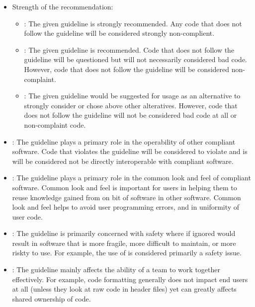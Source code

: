 \begin{itemize}

{}\item Strength of the recommendation:

  \begin{itemize}

  {}\item\textbf{\StrongRecGC}: The given guideline is strongly
  recommended.  Any code that does not follow the guideline will be
  considered strongly non-complient.

  {}\item\textbf{\RecGC}: The given guideline is recommended.  Code
  that does not follow the guideline will be questioned but will not
  necessarily considered bad code.  However, code that does not follow
  the guideline will be considered non-complaint.

  {}\item\textbf{\SuggestGC}: The given guideline would be suggested
  for usage as an alternative to strongly consider or chose above
  other alteratives.  However, code that does not follow the guideline
  will not be considered bad code at all or non-complaint code.

  \end{itemize}

{}\item\textbf{\InteropGC}: The guideline plays a primary role
in the operability of other compliant software.  Code that violates
the guideline will be considered to violate and is {} will be considered not be directly interoperable with
compliant software.

{}\item\textbf{\ComLookFeelGC}: The guideline plays a primary role in
the common look and feel of compliant software.  Common look and feel
is important for users in helping them to reuse knowledge gained from
on bit of software in other software.  Common look and feel helps to
avoid user programming errors, and in uniformity of user code.

{}\item\textbf{\SafeGC}: The guideline is primarily concerned with
safety where if ignored would result in software that is more fragile,
more difficult to maintain, or more riskty to use.  For example, the
use of {} is considered primarily a safety issue.

{}\item\textbf{\TeamGC}: The guideline mainly affects the ability of a
team to work together effectively.  For example, code formatting
generally does not impact end users at all (unless they look at raw
code in header files) yet can greatly affects shared ownership of
code.

\end{itemize}

